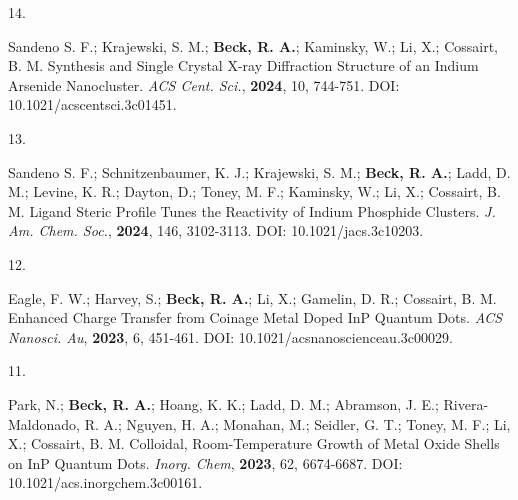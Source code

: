 

\begin{cvpublications}


\cvpublication
{14.}
{\parbox[t]{0.95\textwidth}{\strut Sandeno S. F.; Krajewski, S. M.; \textbf{Beck, R. A.}; Kaminsky, W.; Li, X.; Cossairt, B. M.
Synthesis and Single Crystal X-ray Diffraction Structure of an Indium Arsenide Nanocluster.
\textit{ACS Cent. Sci.}, \textbf{2024}, 10, 744-751.
DOI: 10.1021/acscentsci.3c01451.}}



\cvpublication
{13.}
{\parbox[t]{0.95\textwidth}{\strut Sandeno S. F.; Schnitzenbaumer, K. J.; Krajewski, S. M.; \textbf{Beck, R. A.}; Ladd, D. M.; Levine, K. R.; Dayton, D.; Toney, M. F.; Kaminsky, W.; Li, X.; Cossairt, B. M.
Ligand Steric Profile Tunes the Reactivity of Indium Phosphide Clusters.
\textit{J. Am. Chem. Soc.}, \textbf{2024}, 146, 3102-3113.
DOI: 10.1021/jacs.3c10203.}}



\cvpublication
{12.}
{\parbox[t]{0.95\textwidth}{\strut Eagle, F. W.; Harvey, S.; \textbf{Beck, R. A.}; Li, X.; Gamelin, D. R.; Cossairt, B. M.
Enhanced Charge Transfer from Coinage Metal Doped InP Quantum Dots.
\textit{ACS Nanosci. Au}, \textbf{2023}, 6, 451-461.
DOI: 10.1021/acsnanoscienceau.3c00029.}}



\cvpublication
{11.}
{\parbox[t]{0.95\textwidth}{\strut Park, N.; \textbf{Beck, R. A.}; Hoang, K. K.; Ladd, D. M.; Abramson, J. E.; Rivera-Maldonado, R. A.; Nguyen, H. A.; Monahan, M.; Seidler, G. T.; Toney, M. F.; Li, X.; Cossairt, B. M.
Colloidal, Room-Temperature Growth of Metal Oxide Shells on InP Quantum Dots.
\textit{Inorg. Chem}, \textbf{2023}, 62, 6674-6687.
DOI: 10.1021/acs.inorgchem.3c00161.}}


\end{cvpublications}
